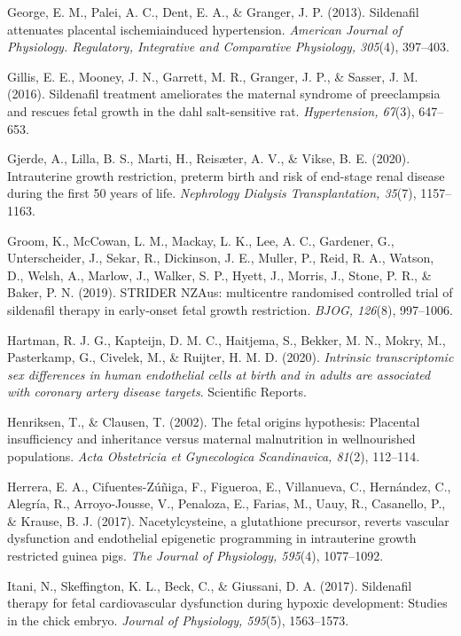 \documentclass[authordate, empirical]{jote-new-article}
\begin{document}
George, E. M., Palei, A. C., Dent, E. A., \& Granger, J. P. (2013). Sildenafil attenuates placental ischemiainduced hypertension. \emph{American Journal of Physiology. Regulatory, Integrative and Comparative Physiology, 305}(4), 397–403.

Gillis, E. E., Mooney, J. N., Garrett, M. R., Granger, J. P., \& Sasser, J. M. (2016). Sildenafil treatment ameliorates the maternal syndrome of preeclampsia and rescues fetal growth in the dahl salt-sensitive rat. \emph{Hypertension, 67}(3), 647–653.

Gjerde, A., Lilla, B. S., Marti, H., Reisæter, A. V., \& Vikse, B. E. (2020). Intrauterine growth restriction, preterm birth and risk of end-stage renal disease during the first 50 years of life. \emph{Nephrology Dialysis Transplantation, 35}(7), 1157–1163.

Groom, K., McCowan, L. M., Mackay, L. K., Lee, A. C., Gardener, G., Unterscheider, J., Sekar, R., Dickinson, J. E., Muller, P., Reid, R. A., Watson, D., Welsh, A., Marlow, J., Walker, S. P., Hyett, J., Morris, J., Stone, P. R., \& Baker, P. N. (2019). STRIDER NZAus: multicentre randomised controlled trial of sildenafil therapy in early-onset fetal growth restriction. \emph{BJOG, 126}(8), 997–1006.

Hartman, R. J. G., Kapteijn, D. M. C., Haitjema, S., Bekker, M. N., Mokry, M., Pasterkamp, G., Civelek, M., \& Ruijter, H. M. D. (2020). \emph{Intrinsic transcriptomic sex differences in human endothelial cells at birth and in adults are associated with coronary artery disease targets}. Scientific Reports.

Henriksen, T., \& Clausen, T. (2002). The fetal origins hypothesis: Placental insufficiency and inheritance versus maternal malnutrition in wellnourished populations. \emph{Acta Obstetricia et Gynecologica Scandinavica, 81}(2), 112–114.

Herrera, E. A., Cifuentes-Zúñiga, F., Figueroa, E., Villanueva, C., Hernández, C., Alegría, R., Arroyo-Jousse, V., Penaloza, E., Farias, M., Uauy, R., Casanello, P., \& Krause, B. J. (2017). Nacetylcysteine, a glutathione precursor, reverts vascular dysfunction and endothelial epigenetic programming in intrauterine growth restricted guinea pigs. \emph{The Journal of Physiology, 595}(4), 1077–1092.

Itani, N., Skeffington, K. L., Beck, C., \& Giussani, D. A. (2017). Sildenafil therapy for fetal cardiovascular dysfunction during hypoxic development: Studies in the chick embryo. \emph{Journal of Physiology, 595}(5), 1563–1573.
\end{document}
